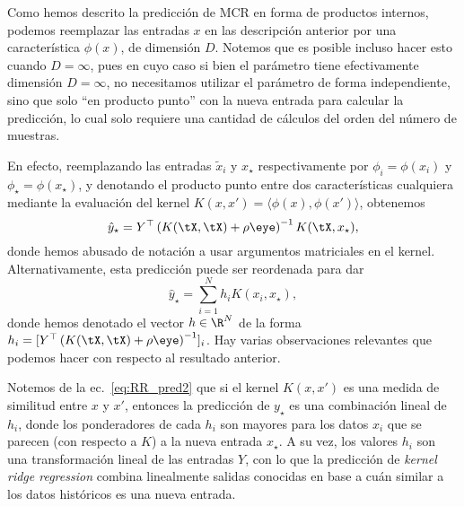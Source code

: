 \begin{remark}
Como hemos descrito la predicción de MCR en forma de productos internos, podemos reemplazar las entradas $x$ en las descripción anterior por una característica $\phi(x)$, de dimensión $D$. Notemos que es posible incluso hacer esto cuando $D=\infty$, pues en cuyo caso si bien el parámetro tiene efectivamente dimensión $D=\infty$, no necesitamos utilizar el parámetro de forma independiente, sino que solo ``en producto punto'' con la nueva entrada para calcular la predicción, lo cual solo requiere una cantidad de cálculos del orden del número de muestras. 
\end{remark}

En efecto, reemplazando las entradas $\tilde{x}_i$ y $x_\star$ respectivamente por $\phi_i=\phi(x_i)$ y $\phi_\star = \phi(x_\star)$, y denotando el producto punto entre dos características cualquiera mediante la evaluación del kernel $K(x,x') = \langle \phi(x) , \phi(x') \rangle$, 
obtenemos 
\begin{equation}
    \hat{y}_\star    = Y^\top \left(K(\tX,\tX) + \rho\eye\right) ^{-1} K(\tX, x_\star),    
\end{equation}
donde hemos abusado de notación a usar argumentos matriciales en el kernel. Alternativamente, esta predicción puede ser reordenada para dar 
\begin{equation}
   \hat{y}_\star    = \sum_{i=1}^N h_i K(x_i,x_\star)\label{eq:RR_pred2},
\end{equation}
donde hemos denotado el vector $h\in\R^N$ de la forma $h_i = [Y^\top \left(K(\tX,\tX) + \rho\eye\right) ^{-1}]_i$. Hay varias observaciones relevantes que podemos hacer con respecto al resultado anterior. 
\begin{remark}
    Notemos de la ec.~\eqref{eq:RR_pred2} que si el kernel $K(x,x')$ es una medida de similitud entre $x$ y $x'$, entonces la predicción de $y_\star$ es una combinación lineal de $h_i$, donde los ponderadores de cada $h_i$ son mayores para los datos $x_i$ que se parecen (con respecto a $K$) a la nueva entrada $x_\star$. A su vez, los valores $h_i$ son una transformación lineal de las entradas $Y$, con lo que la predicción de \emph{kernel ridge regression} combina linealmente salidas conocidas en base a cuán similar a los datos históricos es una nueva entrada. 
\end{remark}

